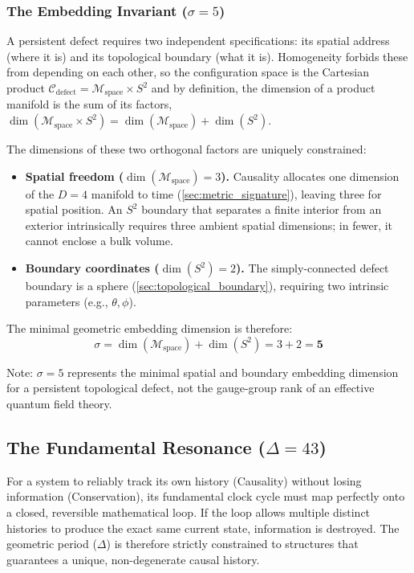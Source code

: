 \subsubsection{The Embedding Invariant (\texorpdfstring{$\sigma=5$}{sigma=5})}
\label{sec:embedding_invariant}

A persistent defect requires two independent specifications: its spatial address (where it is) and its topological boundary (what it is). Homogeneity forbids these from depending on each other, so the configuration space is the Cartesian product $\mathcal{C}_{\text{defect}} = \mathcal{M}_{\text{space}} \times S^2$ and by definition, the dimension of a product manifold is the sum of its factors, $\dim(\mathcal{M}_{\text{space}} \times S^2) = \dim(\mathcal{M}_{\text{space}}) + \dim(S^2)$.

The dimensions of these two orthogonal factors are uniquely constrained:
\begin{itemize}
    \item \textbf{Spatial freedom ($\dim(\mathcal{M}_{\text{space}}) = 3$).} Causality allocates one dimension of the $D=4$ manifold to time (\cref{sec:metric_signature}), leaving three for spatial position. An $S^2$ boundary that separates a finite interior from an exterior intrinsically requires three ambient spatial dimensions; in fewer, it cannot enclose a bulk volume.
    \item \textbf{Boundary coordinates ($\dim(S^2) = 2$).} The simply-connected defect boundary is a sphere (\cref{sec:topological_boundary}), requiring two intrinsic parameters (e.g., $\theta, \phi$).
\end{itemize}

The minimal geometric embedding dimension is therefore:
\begin{equation}
    \sigma = \dim(\mathcal{M}_{\text{space}}) + \dim(S^2) = 3 + 2 = \mathbf{5}
\end{equation}

Note: $\sigma=5$ represents the minimal spatial and boundary embedding dimension for a persistent topological defect, not the gauge-group rank of an effective quantum field theory.


\subsection{The Fundamental Resonance (\texorpdfstring{$\Delta=43$}{Delta=43})}
\label{sec:fundamental_resonance}

For a system to reliably track its own history (Causality) without losing information (Conservation), its fundamental clock cycle must map perfectly onto a closed, reversible mathematical loop. If the loop allows multiple distinct histories to produce the exact same current state, information is destroyed. The geometric period ($\Delta$) is therefore strictly constrained to structures that guarantees a unique, non-degenerate causal history.


